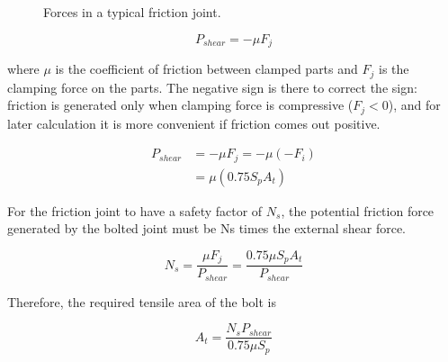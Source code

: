 \documentclass[
10pt,
a4paper,
openany,
svgnames,
]{book}
\begin{document}
\begin{figure}[h]
  \centering
  \caption{Forces in a typical friction joint.}
\end{figure}

\[P_{shear} = -\mu F_j\]

where $\mu$ is the coefficient of friction between clamped parts and $F_j$ is the clamping force on the parts. The negative sign is there to correct the sign: friction is generated only when clamping force is compressive ($F_j < 0$), and for later calculation it is more convenient if friction comes out positive.

\begin{align*}
  P_{shear} &= -\mu F_j = -\mu \left(  - F_i \right) \\
            &= \mu (0.75S_pA_t)
\end{align*}

For the friction joint to have a safety factor of $N_s$, the potential friction force generated by the bolted joint must be Ns times the external shear force.

\begin{equation}
  N_s = \frac{\mu F_j}{P_{shear}} = \frac{0.75\mu S_pA_t}{P_{shear}}
\end{equation}

Therefore, the required tensile area of the bolt is

\begin{equation}
  \label{eqn: req bolt area of shear load}
  A_t = \frac{N_s P_{shear}}{0.75\mu S_p}
\end{equation}
\end{document}
